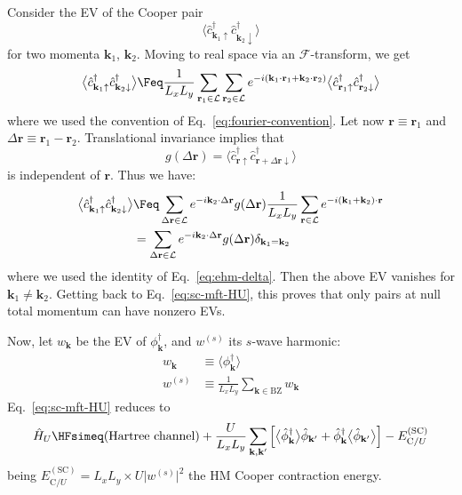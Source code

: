 \begin{tabproof}
	Consider the EV of the Cooper pair
	\[
		\big\langle \hat c_{\mathbf{k}_1\uparrow}^\dagger \hat c_{\mathbf{k}_2\downarrow}^\dagger \big\rangle
	\]
	for two momenta $\mathbf{k}_1$, $\mathbf{k}_2$. Moving to real space via an $\mathcal{F}$-transform, we get
	\[
		\big\langle \hat c_{\mathbf{k}_1\uparrow}^\dagger \hat c_{\mathbf{k}_2\downarrow}^\dagger \big\rangle \Feq \frac{1}{L_x L_y} \sum_{\mathbf{r}_1 \in \mathcal{L}} \sum_{\mathbf{r}_2 \in \mathcal{L}} e^{-i \left(\mathbf{k}_1 \cdot \mathbf{r}_1 + \mathbf{k}_2 \cdot \mathbf{r}_2\right)} \big\langle \hat c_{\mathbf{r}_1\uparrow}^\dagger \hat c_{\mathbf{r}_2\downarrow}^\dagger \big\rangle
	\]
	where we used the convention of Eq.~\eqref{eq:fourier-convention}. Let now $\mathbf{r} \equiv \mathbf{r}_1$ and $\Delta \mathbf{r} \equiv \mathbf{r}_1 - \mathbf{r}_2$. Translational invariance implies that
	\[
		g(\Delta \mathbf{r}) = \big\langle \hat c_{\mathbf{r}\uparrow}^\dagger \hat c_{\mathbf{r}+\Delta\mathbf{r}\downarrow}^\dagger \big\rangle
	\]
	is independent of $\mathbf{r}$. Thus we have:
	\[
	\begin{aligned}
		\big\langle \hat c_{\mathbf{k}_1\uparrow}^\dagger \hat c_{\mathbf{k}_2\downarrow}^\dagger \big\rangle &\Feq \sum_{\Delta\mathbf{r} \in \mathcal{L}} e^{-i \mathbf{k}_2 \cdot \Delta\mathbf{r}} g(\Delta \mathbf{r}) \frac{1}{L_x L_y} \sum_{\mathbf{r} \in \mathcal{L}} e^{-i \left(\mathbf{k}_1 + \mathbf{k}_2\right) \cdot \mathbf{r}} \\
		&= \sum_{\Delta\mathbf{r} \in \mathcal{L}} e^{-i \mathbf{k}_2 \cdot \Delta\mathbf{r}} g(\Delta \mathbf{r}) \delta_{\mathbf{k}_1=\mathbf{k}_2}
	\end{aligned}
	\]
	where we used the identity of Eq.~\eqref{eq:ehm-delta}. Then the above EV vanishes for $\mathbf{k}_1\neq\mathbf{k}_2$. Getting back to Eq.~\eqref{eq:sc-mft-HU}, this proves that only pairs at null total momentum can have nonzero EVs.
\end{tabproof}
%
Now, let $w_\mathbf{k}$ be the EV of $\phi_\mathbf{k}^\dagger$, and $w^{(s)}$ its $s$-wave harmonic:
\begin{align}
	w_\mathbf{k} &\equiv \big\langle
	\phi_\mathbf{k}^\dagger
	\big\rangle \label{eq:sc-wq-def} \\
	w^{(s)} &\equiv \frac{1}{L_x L_y} \sum_{\mathbf{k}\in\mathrm{BZ}} w_\mathbf{k} \label{eq:sc-hm-ws-self-consistency}
\end{align}
Eq.~\eqref{eq:sc-mft-HU} reduces to
\begin{equation}\label{eq:sc-HU-<phi>-phi}
	\hat H_U \HFsimeq \text{(Hartree channel)} + \frac{U}{L_x L_y} \sum_{\mathbf{k},\mathbf{k}'} \left[
	\big\langle
	\hat \phi_\mathbf{k}^\dagger
	\big\rangle \hat \phi_{\mathbf{k}'} + 
	\hat \phi_\mathbf{k}^\dagger \big\langle
	\hat \phi_{\mathbf{k}'}
	\big\rangle
	\right] - E_{\mathrm{C}/U}^{(\mathrm{SC})}
\end{equation}
being $E_{\mathrm{C}/U}^{(\mathrm{SC})}=L_x L_y \times U \big| w^{(s)} \big|^2$ the HM Cooper contraction energy.

